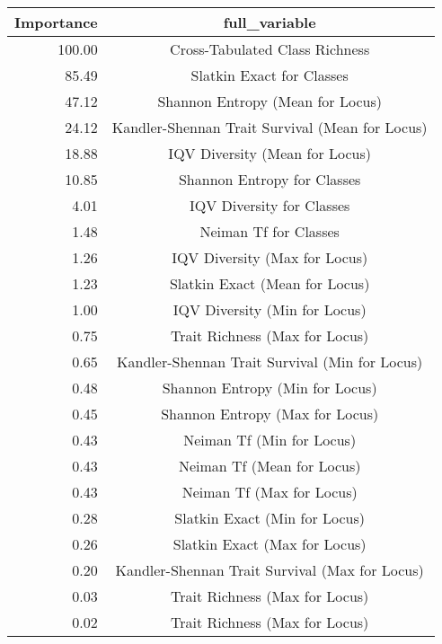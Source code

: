 \begin{tabular}{|r|c|}
  \hline
Importance & full\_variable \\ 
  \hline
100.00 & Cross-Tabulated Class Richness \\ 
  85.49 & Slatkin Exact for Classes \\ 
  47.12 & Shannon Entropy (Mean for Locus) \\ 
  24.12 & Kandler-Shennan Trait Survival (Mean for Locus) \\ 
  18.88 & IQV Diversity (Mean for Locus) \\ 
  10.85 & Shannon Entropy for Classes \\ 
  4.01 & IQV Diversity for Classes \\ 
  1.48 & Neiman Tf for Classes \\ 
  1.26 & IQV Diversity (Max for Locus) \\ 
  1.23 & Slatkin Exact (Mean for Locus) \\ 
  1.00 & IQV Diversity (Min for Locus) \\ 
  0.75 & Trait Richness (Max for Locus) \\ 
  0.65 & Kandler-Shennan Trait Survival (Min for Locus) \\ 
  0.48 & Shannon Entropy (Min for Locus) \\ 
  0.45 & Shannon Entropy (Max for Locus) \\ 
  0.43 & Neiman Tf (Min for Locus) \\ 
  0.43 & Neiman Tf (Mean for Locus) \\ 
  0.43 & Neiman Tf (Max for Locus) \\ 
  0.28 & Slatkin Exact (Min for Locus) \\ 
  0.26 & Slatkin Exact (Max for Locus) \\ 
  0.20 & Kandler-Shennan Trait Survival (Max for Locus) \\ 
  0.03 & Trait Richness (Max for Locus) \\ 
  0.02 & Trait Richness (Max for Locus) \\ 
   \hline
\end{tabular}
